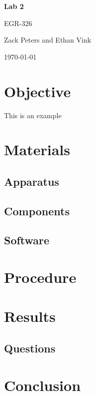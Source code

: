 \documentclass[11pt,a4paper]{article}
\newcommand{\titlestr}{Lab 2}
\newcommand{\authorstr}{Zack Peters and Ethan Vink}
\begin{document}
\begin{titlepage}
  \centering

  \vspace{1cm}
  {\LARGE \bf{\titlestr} \par}
  
  \vspace{.5cm}
  {\LARGE {EGR-326} \par}

  \vspace{1cm}
  {\Large \authorstr \par}

  \vspace{1cm}
  \today    

  \vfill
\end{titlepage}

\newpage

\tableofcontents
\newpage

\section{Objective}
This is an example

\section{Materials}

\subsection{Apparatus}

\subsection{Components}

\subsection{Software}

\section{Procedure}

\section{Results}

\subsection{Questions}

\section{Conclusion}
\end{document}
